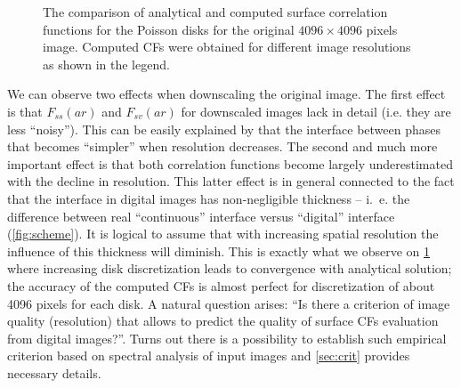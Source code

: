 \documentclass[reprint,amsmath,amssymb,aps,pre,showkeys,showpacs]{revtex4-1}
\begin{document}
\begin{figure}[ht]
  \centering
  \hfill
    \caption[]{The comparison of analytical and computed surface correlation
      functions for the Poisson disks for the original $4096 \times 4096$ pixels
      image. Computed CFs were obtained for different image resolutions as shown
      in the legend.}
    \label{fig:scaling}
\end{figure}

We can observe two effects when downscaling the original image. The
first effect is that $F_{ss}(ar)$ and $F_{sv}(ar)$ for downscaled images lack in
detail (i.e. they are less ``noisy''). This can be easily explained by that the
interface between phases that becomes ``simpler'' when resolution decreases. The
second and much more important effect is that both correlation functions become
largely underestimated with the decline in resolution. This latter effect is in
general connected to the fact that the interface in digital images has
non-negligible thickness -- i.~e. the difference between real ``continuous''
interface versus ``digital'' interface (\cref{fig:scheme}). It is logical to
assume that with increasing spatial resolution the influence of this thickness
will diminish. This is exactly what we observe on \cref{fig:scaling} where
increasing disk discretization leads to convergence with analytical solution;
the accuracy of the computed CFs is almost perfect for discretization of about
4096 pixels for each disk. A natural question arises: ``Is there a criterion of
image quality (resolution) that allows to predict the quality of surface CFs
evaluation from digital images?''. Turns out there is a possibility to establish
such empirical criterion based on spectral analysis of input images and
\cref{sec:crit} provides necessary details.
\end{document}
